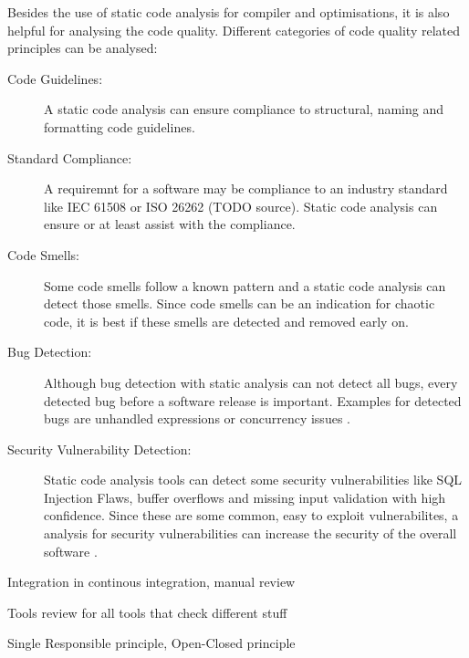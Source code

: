 Besides the use of static code analysis for compiler and optimisations, it is also helpful for analysing the code quality. Different categories of code quality related principles can be analysed:
\begin{description}
    \item[Code Guidelines:] A static code analysis can ensure compliance to structural, naming and formatting code guidelines. 
    \item[Standard Compliance:] A requiremnt for a software may be compliance to an industry standard like IEC 61508 or ISO 26262 (TODO source). Static code analysis can ensure or at least assist with the compliance.   
    \item[Code Smells:] Some code smells follow a known pattern and a static code analysis can detect those smells. Since code smells can be an indication for chaotic code, it is best if these smells are detected and removed early on.
    \item[Bug Detection:] Although bug detection with static analysis can not detect all bugs, every detected bug before a software release is important. Examples for detected bugs are unhandled expressions or concurrency issues \cite{delaitre_evaluating_2015}.
    \item[Security Vulnerability Detection:] Static code analysis tools can detect some security vulnerabilities like SQL Injection Flaws, buffer overflows and missing input validation with high confidence. Since these are some common, easy to exploit vulnerabilites, a analysis for security vulnerabilities can increase the security of the overall software \cite{wichers_source_nodate}.  
\end{description}

Integration in continous integration, manual review

Tools review for all tools that check different stuff

Single Responsible principle, Open-Closed principle

